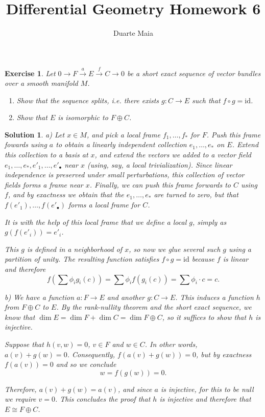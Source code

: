 \documentclass{article}
\title{Differential Geometry Homework 6}
\author{Duarte Maia}
\date{}
\newtheorem{ex}{Exercise}
\theoremstyle{nonumberplain}
\newtheorem{sol}{Solution}
\newcommand{\id}{\mathrm{id}}
\begin{document}
\maketitle

\begin{ex}
Let $0 \rightarrow F \xrightarrow{a} E \xrightarrow{f} C \rightarrow 0$ be a short exact sequence of vector bundles over a smooth manifold $M$.
\begin{enumerate}
\item Show that the sequence splits, i.e. there exists $g \colon C \to E$ such that $f \circ g = \id$.

\item Show that $E$ is isomorphic to $F \oplus C$.
\end{enumerate}
\end{ex}

\begin{sol}
a) Let $x \in M$, and pick a local frame $f_1, \dots, f_*$ for $F$. Push this frame fowards using $a$ to obtain a linearly independent collection $e_1, \dots, e_*$ on $E$. Extend this collection to a basis at $x$, and extend the vectors we added to a vector field $e_1, \dots, e_*, e'_1, \dots, e'_\bullet$ near $x$ (using, say, a local trivialization). Since linear independence is preserved under small perturbations, this collection of vector fields forms a frame near $x$. Finally, we can push this frame forwards to $C$ using $f$, and by exactness we obtain that the $e_1, \dots, e_*$ are turned to zero, but that $f(e'_1), \dots, f(e'_\bullet)$ forms a local frame for $C$.

It is with the help of this local frame that we define a local $g$, simply as $g(f(e'_i)) = e'_i$.

This $g$ is defined in a neighborhood of $x$, so now we glue several such $g$ using a partition of unity. The resulting function satisfies $f \circ g = \id$ because $f$ is linear and therefore
\[f(\sum \phi_i g_i(c)) = \sum \phi_i f(g_i(c)) = \sum \phi_i \cdot c = c.\]

\medskip

b) We have a function $a \colon F \to E$ and another $g \colon C \to E$. This induces a function $h$ from $F \oplus C$ to $E$. By the rank-nullity theorem and the short exact sequence, we know that $\dim E = \dim F + \dim C = \dim F \oplus C$, so it suffices to show that $h$ is injective.

Suppose that $h(v,w) = 0$, $v \in F$ and $w \in C$. In other words, $a(v) + g(w) = 0$. Consequently, $f(a(v) + g(w)) = 0$, but by exactness $f(a(v)) = 0$ and so we conclude
\[w = f(g(w)) = 0.\]

Therefore, $a(v) + g(w) = a(v)$, and since $a$ is injective, for this to be null we require $v = 0$. This concludes the proof that $h$ is injective and therefore that $E \cong F \oplus C$.
\end{sol}
\end{document}
